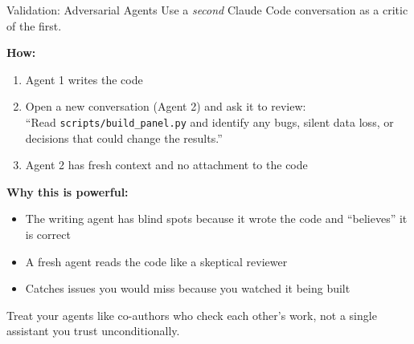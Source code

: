 \documentclass[aspectratio=169, 11pt]{beamer}
\begin{document}
\begin{frame}{Validation: Adversarial Agents}
  Use a \textit{second} Claude Code conversation as a critic of the first.

  \vspace{0.5em}
  \textbf{How:}
  \begin{enumerate}
    \item Agent 1 writes the code
    \item Open a new conversation (Agent 2) and ask it to review:\\
      {\small ``Read \texttt{scripts/build\_panel.py} and identify any bugs, silent data loss, or decisions that could change the results.''}
    \item Agent 2 has fresh context and no attachment to the code
  \end{enumerate}

  \vspace{0.5em}
  \textbf{Why this is powerful:}
  \begin{itemize}
    \item The writing agent has blind spots because it wrote the code and ``believes'' it is correct
    \item A fresh agent reads the code like a skeptical reviewer
    \item Catches issues you would miss because you watched it being built
  \end{itemize}

  \vspace{0.5em}
  \alert{Treat your agents like co-authors who check each other's work, not a single assistant you trust unconditionally.}
\end{frame}

\end{document}
